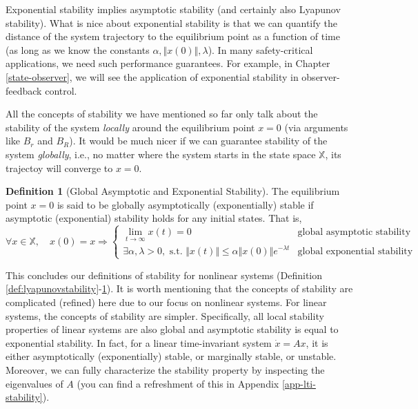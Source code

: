 \documentclass[
]{book}
\theoremstyle{definition}
\newtheorem{definition}{Definition}[chapter]
\theoremstyle{definition}
\theoremstyle{definition}
\theoremstyle{definition}
\theoremstyle{remark}
\begin{document}
Exponential stability implies asymptotic stability (and certainly also Lyapunov stability). What is nice about exponential stability is that we can quantify the distance of the system trajectory to the equilibrium point as a function of time (as long as we know the constants \(\alpha, \Vert x(0) \Vert, \lambda\)). In many safety-critical applications, we need such performance guarantees. For example, in Chapter \ref{state-observer}, we will see the application of exponential stability in observer-feedback control.

All the concepts of stability we have mentioned so far only talk about the stability of the system \emph{locally} around the equilibrium point \(x=0\) (via arguments like \(B_r\) and \(B_R\)). It would be much nicer if we can guarantee stability of the system \emph{globally}, i.e., no matter where the system starts in the state space \(\mathbb{X}\), its trajectoy will converge to \(x=0\).

\begin{definition}[Global Asymptotic and Exponential Stability]
\protect\hypertarget{def:globalstability}{}\label{def:globalstability}The equilibrium point \(x = 0\) is said to be globally asymptotically (exponentially) stable if asymptotic (exponential) stability holds for any initial states. That is,
\[
\forall x \in \mathbb{X}, \quad x(0) = x \Longrightarrow \begin{cases}
\lim_{t \rightarrow \infty} x(t) = 0  & \text{global asymptotic stability} \\
\exists \alpha, \lambda > 0, \text{ s.t. } \Vert x(t) \Vert \leq \alpha \Vert x(0) \Vert e^{-\lambda t} & \text{global exponential stability}
\end{cases}
\]
\end{definition}

This concludes our definitions of stability for nonlinear systems (Definition \ref{def:lyapunovstability}-\ref{def:globalstability}). It is worth mentioning that the concepts of stability are complicated (refined) here due to our focus on nonlinear systems. For linear systems, the concepts of stability are simpler. Specifically, all local stability properties of linear systems are also global and asymptotic stability is equal to exponential stability. In fact, for a linear time-invariant system \(\dot{x} = Ax\), it is either asymptotically (exponentially) stable, or marginally stable, or unstable. Moreover, we can fully characterize the stability property by inspecting the eigenvalues of \(A\) (you can find a refreshment of this in Appendix \ref{app-lti-stability}).
\end{document}
